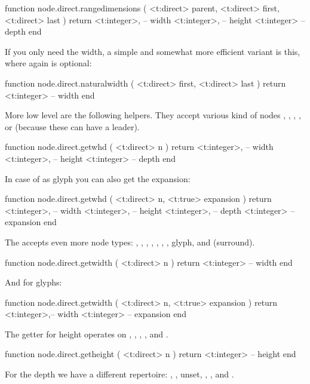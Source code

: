 \starttyping[option=LUA]
function node.direct.rangedimensions (
    <t:direct> parent,
    <t:direct> first,
    <t:direct> last
)
    return
        <t:integer>, -- width
        <t:integer>, -- height
        <t:integer>  -- depth
end
\stoptyping

If you only need the width, a simple and somewhat more efficient variant is this,
where again  is optional:

\starttyping[option=LUA]
function node.direct.naturalwidth (
    <t:direct> first,
    <t:direct> last
)
    return <t:integer> -- width
end
\stoptyping

More low level are the following helpers. They accept various kind of nodes
, , , ,  or 
(because these can have a leader).

\starttyping[option=LUA]
function node.direct.getwhd ( <t:direct> n )
    return
        <t:integer>, -- width
        <t:integer>, -- height
        <t:integer>  -- depth
end
\stoptyping

In case of as glyph you can also get the expansion:

\starttyping[option=LUA]
function node.direct.getwhd ( <t:direct> n, <t:true> expansion )
    return
        <t:integer>, -- width
        <t:integer>, -- height
        <t:integer>, -- depth
        <t:integer>  -- expansion
end
\stoptyping

The  accepts even more node types: , ,
, , , , , \type
{glyph},  and  (surround).

\starttyping[option=LUA]
function node.direct.getwidth ( <t:direct> n )
    return <t:integer> -- width
end
\stoptyping

And for glyphs:

\starttyping[option=LUA]
function node.direct.getwidth ( <t:direct> n, <t:true> expansion )
    return
        <t:integer>,-- width
        <t:integer> -- expansion
end
\stoptyping

The getter for height operates on , , ,
,  and .

\starttyping[option=LUA]
function node.direct.getheight ( <t:direct> n )
    return <t:integer> -- height
end
\stoptyping

For the depth we have a different repertoire: , , \type
{unset}, , ,  and .

